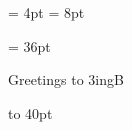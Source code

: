 

\hruledefaultheight = 4pt
\hruledefaultdepth = 8pt

\vruledefaultwidth = 36pt

\vglue 1in

%

\smallskip
\ehrule
\medskip

\noindent \evrule \quad Greetings
\smallskip
\vbox to 3in{\leaders\evrule\vfil gB}

\hbox to 40pt{\downbracefill} %
\bye
